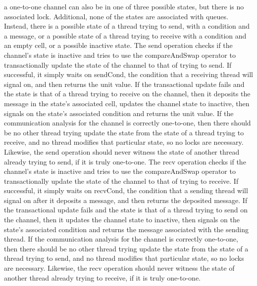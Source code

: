 \documentclass{article}
\begin{document}
a one-to-one channel can also be in one of three possible states, but there is no associated lock. Additional, none of the states are associated with queues.  Instead, there is a possible state of a thread trying to send, with a condition and a message, or a possible state of a thread trying to receive with a condition and an empty cell, or a possible inactive state.
	The send operation checks if the channel's state is inactive and tries to use the compareAndSwap operator to transactionally update the state of the channel to that of trying to send.  If successful, it simply waits on sendCond, the condition that a receiving thread will signal on, and then returns the unit value.  If the transactional update fails and the state is that of a thread trying to receive on the channel, then it deposits the message in the state's associated cell, updates the channel state to inactive, then signals on the state's associated condition and returns the unit value.  If the communication analysis for the channel is correctly one-to-one, then there should be no other thread trying update the state from the state of a thread trying to receive, and no thread modifies that particular state, so no locks are necessary.  Likewise, the send operation should never witness the state of another thread already trying to send, if it is truly one-to-one.
	The recv operation checks if the channel's state is inactive and tries to use the compareAndSwap operator to transactionally update the state of the channel to that of trying to receive.  If successful, it simply waits on recvCond, the condition that a sending thread will signal on after it deposits a message, and then returns the deposited message.  If the transactional update fails and the state is that of a thread trying to send on the channel, then it updates the channel state to inactive, then signals on the state's associated condition and returns the message associated with the sending thread.  If the communication analysis for the channel is correctly one-to-one, then there should be no other thread trying update the state from the state of a thread trying to send, and no thread modifies that particular state, so no locks are necessary.  Likewise, the recv operation should never witness the state of another thread already trying to receive, if it is truly one-to-one.
\end{document}
